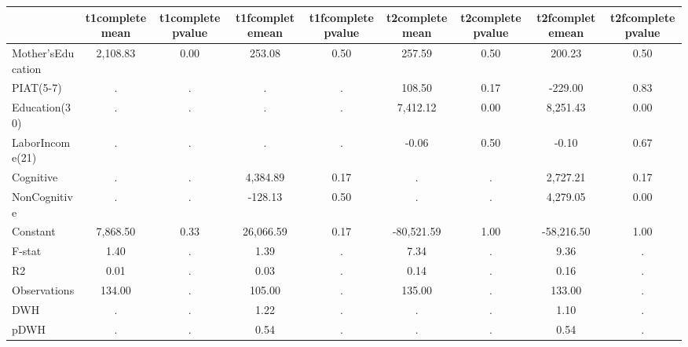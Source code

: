 \begin{table}[htbp]
\begin{tabular}{lcccccccc} \hline \hline
 & t1completemean  & t1completepvalue  & t1fcompletemean  & t1fcompletepvalue  & t2completemean  & t2completepvalue  & t2fcompletemean  & t2fcompletepvalue  \\  \hline 
Mother'sEducation &     2,108.83 &         0.00 &       253.08 &         0.50 &       257.59 &         0.50 &       200.23 &         0.50 \\  
PIAT(5-7) &            . &            . &            . &            . &       108.50 &         0.17 &      -229.00 &         0.83 \\  
Education(30) &            . &            . &            . &            . &     7,412.12 &         0.00 &     8,251.43 &         0.00 \\  
LaborIncome(21) &            . &            . &            . &            . &        -0.06 &         0.50 &        -0.10 &         0.67 \\  
Cognitive &            . &            . &     4,384.89 &         0.17 &            . &            . &     2,727.21 &         0.17 \\  
NonCognitive &            . &            . &      -128.13 &         0.50 &            . &            . &     4,279.05 &         0.00 \\  
Constant &     7,868.50 &         0.33 &    26,066.59 &         0.17 &   -80,521.59 &         1.00 &   -58,216.50 &         1.00 \\  
F-stat &         1.40 &            . &         1.39 &            . &         7.34 &            . &         9.36 &            . \\  
R2 &         0.01 &            . &         0.03 &            . &         0.14 &            . &         0.16 &            . \\  
Observations &       134.00 &            . &       105.00 &            . &       135.00 &            . &       133.00 &            . \\  
DWH &            . &            . &         1.22 &            . &            . &            . &         1.10 &            . \\  
pDWH &            . &            . &         0.54 &            . &            . &            . &         0.54 &            . \\  
\hline \hline \end{tabular}
\end{table}
